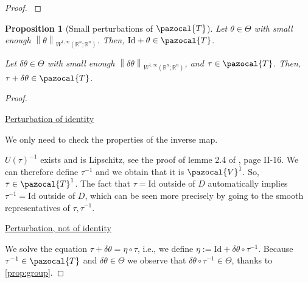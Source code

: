 \documentclass[english,a4paper,9pt,oneside]{scrbook}	%
\theoremstyle{break}
\newtheorem{prop}[equation]{Proposition}
\newenvironment{mproof}[1][\proofname]{%
  \begin{proof}[#1]$ $\par\nobreak\ignorespaces
}{%
  \end{proof}
}
\renewcommand*{\proofname}{Proof}
\theoremstyle{remark}
\newcommand{\mR}{\mathbb{R}}
\newcommand{\cV}{\pazocal{V}}
\newcommand{\norm}[1]{\left\lVert#1\right\rVert}
\newcommand{\cT}{\pazocal{T}}
\newcommand{\id}{\text{Id}}
\newcommand{\te}{\theta}
\newcommand{\Te}{\Theta}
\begin{document}
\begin{appendices}
\begin{mproof}
\end{mproof}

\begin{prop}[Small perturbations of $\cT$]
\label{prop:ptb_id}
Let $\te \in \Te$ with small enough $\norm{\te}_{W^{1,\infty}(\mR^n;\mR^n)}$. Then, $\id+\te\in \cT$.

Let $\delta \te \in \Te$ with small enough $\norm{\delta\te}_{W^{1,\infty}(\mR^n;\mR^n)}$, and $\tau \in \cT$. Then, $\tau + \delta \te\in \cT$.

\end{prop}
\begin{mproof}

\underline{Perturbation of identity}

We only need to check the properties of the inverse map.

$U(\tau)^{-1}$ exists and is Lipschitz, see the proof of lemme 2.4 of \cite{murat}, page II-16. We can therefore define $\tau^{-1}$ and we obtain that it is $\cV^1$. So, $\tau \in \cT^1$. The fact that $\tau = \id$ outside of $D$ automatically implies $\tau^{-1}=\id$ outside of $D$, which can be seen more precisely by going to the smooth representatives of $\tau, \tau^{-1}$.

%
%

\underline{Perturbation, not of identity}

We solve the equation $\tau + \delta \te =\eta \circ \tau$, i.e., we define $\eta:=\id + \delta \te \circ \tau^{-1}$. Because $\tau^{-1} \in \cT$ and $\delta \te \in \Te$ we observe that $\delta \te \circ \tau^{-1} \in \Te $, thanks to \cref{prop:group}.


\end{mproof}
\end{appendices}
\end{document}
